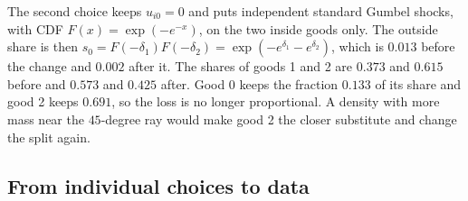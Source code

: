 The second choice keeps $u_{i0} = 0$ and puts independent standard Gumbel shocks, with CDF
$F(x) = \exp(-e^{-x})$, on the two inside goods only. The outside share is then
$s_0 = F(-\delta_1)F(-\delta_2) = \exp(-e^{\delta_1} - e^{\delta_2})$, which is $0.013$ before the change and $0.002$
after it. The shares of goods 1 and 2 are $0.373$ and $0.615$ before and $0.573$ and $0.425$ after. Good 0 keeps the
fraction $0.133$ of its share and good 2 keeps $0.691$, so the loss is no longer proportional. A density with more
mass near the $45$-degree ray would make good 2 the closer substitute and change the split again.

\subsection{From individual choices to data}\label{sec:06-estimation-micro}

